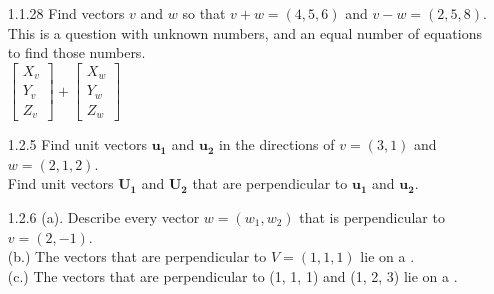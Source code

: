 \documentclass[10pt,twoside,reqno]{article}
\begin{document}
\begin{enumerate}
\item[1.1.28] Find vectors $v$ and $w$ so that $ v + w = (4, 5, 6)$ and $v - w = (2, 5, 8)$. This is a question with \underline{\hspace{6mm}} unknown numbers, and an equal number of equations to find those numbers.\\
\vspace{3mm}
$\left[\begin{smallmatrix} X_{v}\\ Y_{v}\\ Z_{v} \end{smallmatrix} \right] + \left[\begin{smallmatrix} X_{w}\\ Y_{w}\\ Z_{w} \end{smallmatrix} \right]$
\end{enumerate} 
\begin{enumerate}
\item[1.2.5] Find unit vectors $\pmb{u_{1}}$ and $\pmb{u_{2}}$ in the directions of $v = (3, 1)$ and $w = (2, 1, 2)$.\\
Find unit vectors $\pmb{U_{1}}$ and $\pmb{U_{2}}$ that are perpendicular to $\pmb{u_{1}}$ and $\pmb{u_{2}}$.\\
\item[1.2.6] (a). Describe every vector $w = (w_{1}, w_{2})$ that is perpendicular to $v = (2, -1)$.\\
(b.) The vectors that are perpendicular to $V = (1, 1, 1)$ lie on a \underline{\hspace{6mm}}.\\
(c.) The vectors that are perpendicular to (1, 1, 1) and (1, 2, 3) lie on a \underline{\hspace{6mm}}.\\

\end{enumerate}
\end{document}
